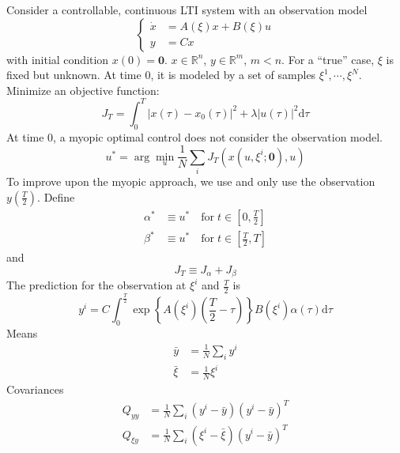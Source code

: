 \documentclass[a4paper,onecolumn]{article}
\begin{document}
\setcounter{page}{1}

\noindent Consider a controllable, continuous LTI system with an observation model
\begin{equation}
  \left\{
    \begin{split}
      \dot{x} &= A(\xi)x + B(\xi)u\\
	  y &= Cx
	\end{split}
  \right.
\end{equation}
with initial condition $x(0) = \textbf{0}$.
$x\in \mathbb{R}^n$, $y\in \mathbb{R}^m$, $m<n$. For a ``true'' case,
$\xi$ is fixed but unknown. At time $0$, it is modeled by a set of
samples $\xi^1, \cdots, \xi^N$.\\
Minimize an objective function:
\begin{equation}
    J_T = \int_0^T |x(\tau)-x_0(\tau)|^2 + \lambda|u(\tau)|^2\textrm{d}\tau
\end{equation}
At time $0$, a myopic optimal control does not consider the observation
model. 
\begin{equation}
    u^* = \arg\min_u \frac{1}{N}\sum_i J_T\left(x(u,\xi^i;\textbf{0}), u
    \right)
\end{equation}
To improve upon the myopic approach, we use and only use the observation
$y(\frac{T}{2})$.
Define 
\begin{equation}\begin{split}
    \alpha^* &\equiv u^* \quad \textrm{for} \;t \in [0,\frac{T}{2}]\\
	\beta^* &\equiv u^* \quad \textrm{for} \;t \in [\frac{T}{2}, T]
\end{split}\end{equation}
and
\begin{equation}
    J_{T} \equiv J_{\alpha} + J_{\beta}
\end{equation}
The prediction for the observation at $\xi^i$ and $\frac{T}{2}$ is
\begin{equation}
    y^i = C \int_0^\frac{T}{2}
	\exp\left\{A(\xi^i)\left(\frac{T}{2}-\tau\right)\right\}B(\xi^i)\alpha(\tau)\textrm{d}\tau
\end{equation}
Means
\begin{equation}\begin{split}
    \bar{y} &= \frac{1}{N}\sum_iy^i\\
	\bar{\xi} &= \frac{1}{N}\xi^i
\end{split}\end{equation}
Covariances
\begin{equation}\begin{split}
    Q_{yy} &= \frac{1}{N}\sum_i\left(y^i - \bar{y}\right) \left(y^i -
	\bar{y}\right)^T\\
	Q_{\xi y} &= \frac{1}{N}\sum_i \left(\xi^i-\bar{\xi}\right)
	\left(y^i - \bar{y}\right)^T
\end{split}\end{equation}
\end{document}
